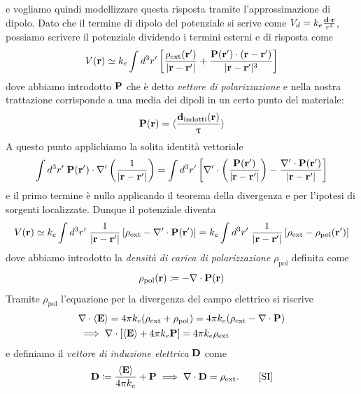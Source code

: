 e vogliamo quindi modellizzare questa risposta tramite l'approssimazione di dipolo. Dato che il termine di dipolo del potenziale si scrive come 
$ V_d = k_e \frac{\mathbf{d} \cdot \mathbf{r}}{r^3} $, possiamo scrivere il potenziale dividendo i termini esterni e di risposta come 
\begin{align}
  V(\mathbf{r}) \simeq k_e \int d^3r'\left[ \frac{\rho_{\text{ext}}(\mathbf{r'} )}{|\mathbf{r - r'}|} + \frac{\mathbf{P}(\mathbf{r'}) \cdot (\mathbf{r - r'})}{|\mathbf{r-r'}|^3} \right]
\end{align}
dove abbiamo introdotto $ \mathbf{P} $ che è detto  \textit{vettore di polarizzazione} e nella nostra trattazione corrisponde a una media dei dipoli in un certo 
punto del materiale:
\begin{align}
  \mathbf{P}(\mathbf{r}) = \langle \frac{\mathbf{d}_{\text{indotti}}( \mathbf{r})}{\uptau} \rangle
\end{align}
A questo punto applichiamo la solita identità vettoriale
\begin{align}
  \int d^3r'\; \mathbf{P}(\mathbf{r'}) \cdot \nabla' \left( \frac{1}{|\mathbf{r-r'}|} \right) 
  = \int d^3r'\left[ \nabla' \cdot \left( \frac{\mathbf{P}(\mathbf{r'})}{|\mathbf{r-r'}|} \right) - \frac{\nabla' \cdot \mathbf{P}(\mathbf{r'})}{|\mathbf{r - r'}|} \right]
\end{align}
e il primo termine è nullo applicando il teorema della divergenza e per l'ipotesi di sorgenti localizzate. Dunque il potenziale diventa
\begin{align}
  V(\mathbf{r}) \simeq k_e \int d^3r' \;\frac{1}{\mathbf{|r - r'|}} \left[ \rho_{\text{ext}} - \nabla' \cdot \mathbf{P}(\mathbf{r'}) \right] 
  = k_e \int d^3r' \;\frac{1}{\mathbf{|r - r'|}} \left[ \rho_{\text{ext}} - \rho_{\text{pol}}(\mathbf{r'}) \right] 
\end{align}
dove abbiamo introdotto la \textit{densità di carica di polarizzazione} $ \rho_{\text{pol}} $ definita come 
\begin{align}
  \rho_{\text{pol}}(\mathbf{r}) \coloneq - \nabla \cdot \mathbf{P}(\mathbf{r})
\end{align}
Tramite $ \rho_{\text{pol}} $ l'equazione per la divergenza del campo elettrico si riscrive
\begin{align}
  &\nabla \cdot \langle \mathbf{E} \rangle = 4\pi k_e ({\rho_{\text{ext}}} +{\rho_{\text{pol}}})
  = 4\pi k_e ({\rho_{\text{ext}}} - \nabla \cdot { \mathbf{P} })
  \\
  &\implies \nabla \cdot \left[ \langle \mathbf{E} \rangle + 4\pi k_e {\mathbf{P}} \right] = 4\pi k_e {\rho_{\text{ext}}}
\end{align}
e definiamo il \textit{vettore di induzione elettrica} $ \mathbf{D} $ come
\begin{align}
  \mathbf{D} \coloneq \frac{\langle \mathbf{E} \rangle}{4\pi k_e}  + \mathbf{P} \implies \nabla \cdot \mathbf{D} = \rho_{\text{ext}}. \tag*{[SI]}
\end{align}
